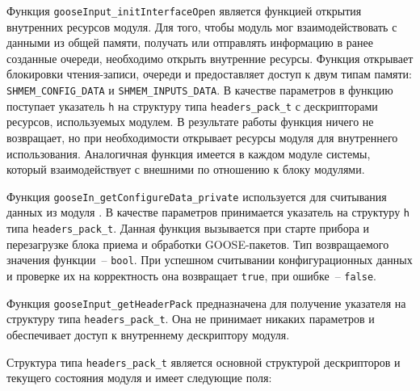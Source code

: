 Функция \lstinline{gooseInput_initInterfaceOpen} является функцией открытия
внутренних ресурсов модуля. Для того, чтобы модуль мог взаимодействовать с
данными из общей памяти, получать или отправлять информацию в ранее созданные
очереди, необходимо открыть внутренние ресурсы. Функция открывает блокировки
чтения-записи, очереди и предоставляет доступ к двум типам памяти:
\lstinline{SHMEM_CONFIG_DATA} и \lstinline{SHMEM_INPUTS_DATA}.
В качестве параметров в функцию поступает указатель \lstinline{h} на структуру
типа \lstinline{headers_pack_t} с дескрипторами ресурсов, используемых модулем.
В результате работы функция ничего не возвращает, но при необходимости открывает
ресурсы модуля для внутреннего использования. Аналогичная функция имеется
в каждом модуле системы, который взаимодействует с внешними по отношению к блоку
модулями.

Функция \lstinline{gooseIn_getConfigureData_private} используется для считывания данных из модуля \moduleCfg. В качестве параметров принимается указатель на структуру \lstinline{h} типа \lstinline{headers_pack_t}. Данная функция вызывается при старте прибора и перезагрузке блока приема и обработки GOOSE-пакетов. Тип возвращаемого
значения функции~-- \lstinline{bool}. При успешном считывании конфигурационных
данных и проверке их на корректность
она возвращает \lstinline{true}, при ошибке~-- \lstinline{false}.

Функция \lstinline{gooseInput_getHeaderPack} предназначена для получение указателя
на структуру типа \lstinline{headers_pack_t}. Она не принимает никаких параметров
и обеспечивает доступ к внутреннему дескриптору модуля.

Структура типа \lstinline{headers_pack_t} является основной структурой дескрипторов и текущего состояния модуля и имеет следующие поля:

